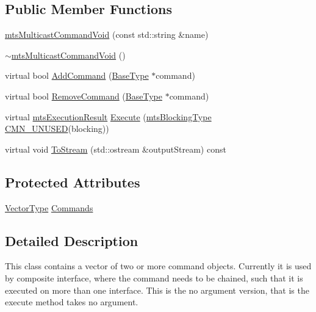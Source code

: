 \subsection*{Public Member Functions}
\begin{DoxyCompactItemize}
\item 
\hyperlink{classmts_multicast_command_void_a0cab0a922e91a5e620e70162f7d3fe65}{mts\-Multicast\-Command\-Void} (const std\-::string \&name)
\item 
\hyperlink{classmts_multicast_command_void_ad96e12608775cabdd603604353cff4a7}{$\sim$mts\-Multicast\-Command\-Void} ()
\item 
virtual bool \hyperlink{classmts_multicast_command_void_a2d04e7d3c12a6a47535540d34c737576}{Add\-Command} (\hyperlink{classmts_command_void_aa0e2be86c520aef7b9c3a59e3cfbbce3}{Base\-Type} $\ast$command)
\item 
virtual bool \hyperlink{classmts_multicast_command_void_a7b9664767999861a6bc08fda5e405e94}{Remove\-Command} (\hyperlink{classmts_command_void_aa0e2be86c520aef7b9c3a59e3cfbbce3}{Base\-Type} $\ast$command)
\item 
virtual \hyperlink{classmts_execution_result}{mts\-Execution\-Result} \hyperlink{classmts_multicast_command_void_a8e00a2156c2aafd723a554e979974b60}{Execute} (\hyperlink{mts_forward_declarations_8h_ad7426ccb6c883bc780d0ee197dddcbe7}{mts\-Blocking\-Type} \hyperlink{cmn_portability_8h_a021894e2626935fa2305434b1e893ff6}{C\-M\-N\-\_\-\-U\-N\-U\-S\-E\-D}(blocking))
\item 
virtual void \hyperlink{classmts_multicast_command_void_a8d3442e9f633665c9e465c351432c82e}{To\-Stream} (std\-::ostream \&output\-Stream) const 
\end{DoxyCompactItemize}
\subsection*{Protected Attributes}
\begin{DoxyCompactItemize}
\item 
\hyperlink{classmts_multicast_command_void_a2d0478105f8fcc377056363ab5aa7fa0}{Vector\-Type} \hyperlink{classmts_multicast_command_void_a71303972432c845838760333033f6226}{Commands}
\end{DoxyCompactItemize}


\subsection{Detailed Description}
This class contains a vector of two or more command objects. Currently it is used by composite interface, where the command needs to be chained, such that it is executed on more than one interface. This is the no argument version, that is the execute method takes no argument. 

